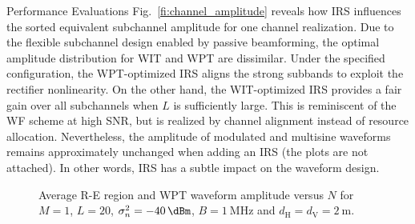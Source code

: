 \documentclass[journal]{IEEEtran}
\begin{document}
\begin{section}{Performance Evaluations}
		Fig.~\ref{fi:channel_amplitude} reveals how IRS influences the sorted equivalent subchannel amplitude for one channel realization. Due to the flexible subchannel design enabled by passive beamforming, the optimal amplitude distribution for WIT and WPT are dissimilar. Under the specified configuration, the WPT-optimized IRS aligns the strong subbands to exploit the rectifier nonlinearity. On the other hand, the WIT-optimized IRS provides a fair gain over all subchannels when $L$ is sufficiently large. This is reminiscent of the WF scheme at high SNR, but is realized by channel alignment instead of resource allocation. Nevertheless, the amplitude of modulated and multisine waveforms remains approximately unchanged when adding an IRS (the plots are not attached). In other words, IRS has a subtle impact on the waveform design.

		\begin{figure}[!t]
			\centering
			\caption{Average R-E region and WPT waveform amplitude versus $N$ for $M=1$, $L=20$, $\sigma_n^2=\SI{-40}{\dBm}$, $B=\SI{1}{\MHz}$ and $d_{\mathrm{H}}=d_{\mathrm{V}}=\SI{2}{\meter}$.}
		\end{figure}


\end{section}
\end{document}
